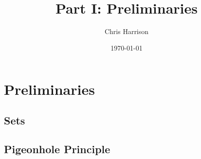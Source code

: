 \documentclass[11pt,a4paper]{article}
\title{Part I: Preliminaries}
\author{Chris Harrison}
\date{\today}
\begin{document}
\maketitle 
\section{Preliminaries}
\label{title}

\subsection{Sets}
\label{sets}

\subsection{Pigeonhole Principle}
\label{pigeonhole-principle}
\end{document}
